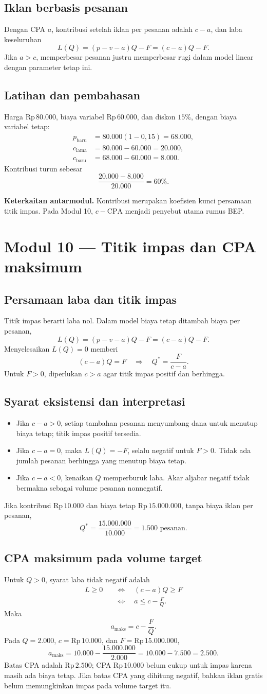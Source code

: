 \documentclass[11pt,a4paper]{article}
\newcommand{\modul}[2]{\clearpage\section{Modul #1 --- #2}}
\newcommand{\bagian}[1]{\Needspace{5\baselineskip}\subsection{#1}}
\newcommand{\jembatan}[1]{\par\textbf{Keterkaitan antarmodul.} #1\par}
\newcommand{\CPA}{\mathrm{CPA}}
\newcommand{\rp}[1]{\ensuremath{\mathrm{Rp}\,#1}}
\begin{document}
\bagian{Iklan berbasis pesanan}
Dengan CPA \(a\), kontribusi setelah iklan per pesanan adalah \(c-a\), dan laba keseluruhan
\[
L(Q)=(p-v-a)Q-F=(c-a)Q-F.
\]
Jika \(a>c\), memperbesar pesanan justru memperbesar rugi dalam model linear dengan parameter tetap ini.

\bagian{Latihan dan pembahasan}
Harga \rp{80.000}, biaya variabel \rp{60.000}, dan diskon \(15\%\), dengan biaya variabel tetap:
\[
\begin{aligned}
p_{\text{baru}}&=80.000(1-0{,}15)=68.000,\\
c_{\text{lama}}&=80.000-60.000=20.000,\\
c_{\text{baru}}&=68.000-60.000=8.000.
\end{aligned}
\]
Kontribusi turun sebesar
\[
\frac{20.000-8.000}{20.000}=60\%.
\]
\jembatan{Kontribusi merupakan koefisien kunci persamaan titik impas. Pada Modul 10, \(c-\CPA\) menjadi penyebut utama rumus BEP.}

\modul{10}{Titik impas dan CPA maksimum}
\bagian{Persamaan laba dan titik impas}
Titik impas berarti laba nol. Dalam model biaya tetap ditambah biaya per pesanan,
\[
L(Q)=(p-v-a)Q-F=(c-a)Q-F.
\]
Menyelesaikan \(L(Q)=0\) memberi
\[
(c-a)Q=F\quad\Longrightarrow\quad Q^*=\frac{F}{c-a}.
\]
Untuk \(F>0\), diperlukan \(c>a\) agar titik impas positif dan berhingga.

\bagian{Syarat eksistensi dan interpretasi}
\begin{itemize}
\item Jika \(c-a>0\), setiap tambahan pesanan menyumbang dana untuk menutup biaya tetap; titik impas positif tersedia.
\item Jika \(c-a=0\), maka \(L(Q)=-F\), selalu negatif untuk \(F>0\). Tidak ada jumlah pesanan berhingga yang menutup biaya tetap.
\item Jika \(c-a<0\), kenaikan \(Q\) memperburuk laba. Akar aljabar negatif tidak bermakna sebagai volume pesanan nonnegatif.
\end{itemize}
Jika kontribusi \rp{10.000} dan biaya tetap \rp{15.000.000}, tanpa biaya iklan per pesanan,
\[
Q^*=\frac{15.000.000}{10.000}=1.500\text{ pesanan}.
\]

\bagian{CPA maksimum pada volume target}
Untuk \(Q>0\), syarat laba tidak negatif adalah
\[
\begin{aligned}
L\ge0&\quad\Longleftrightarrow\quad(c-a)Q\ge F\\
&\quad\Longleftrightarrow\quad a\le c-\frac{F}{Q}.
\end{aligned}
\]
Maka
\[
a_{\text{maks}}=c-\frac{F}{Q}.
\]
Pada \(Q=2.000\), \(c=\rp{10.000}\), dan \(F=\rp{15.000.000}\),
\[
a_{\text{maks}}=10.000-\frac{15.000.000}{2.000}
=10.000-7.500=2.500.
\]
Batas CPA adalah \rp{2.500}; CPA \rp{10.000} belum cukup untuk impas karena masih ada biaya tetap. Jika batas CPA yang dihitung negatif, bahkan iklan gratis belum memungkinkan impas pada volume target itu.
\end{document}
